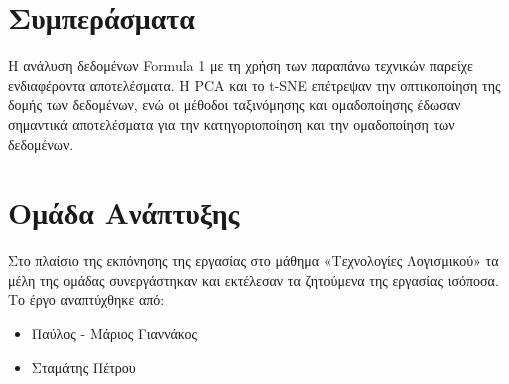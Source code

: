 \documentclass{article}
\begin{document}
\section{Συμπεράσματα}
Η ανάλυση δεδομένων Formula 1 με τη χρήση των παραπάνω τεχνικών παρείχε ενδιαφέροντα αποτελέσματα. Η PCA και το t-SNE επέτρεψαν την οπτικοποίηση της δομής των δεδομένων, ενώ οι μέθοδοι ταξινόμησης και ομαδοποίησης έδωσαν σημαντικά αποτελέσματα για την κατηγοριοποίηση και την ομαδοποίηση των δεδομένων.

\section{Ομάδα Ανάπτυξης}
Στο πλαίσιο της εκπόνησης της εργασίας στο μάθημα «Τεχνολογίες Λογισμικού» τα μέλη της ομάδας συνεργάστηκαν και εκτέλεσαν τα ζητούμενα της εργασίας ισόποσα. Το έργο αναπτύχθηκε από:
\begin{itemize}
    \item Παύλος - Μάριος Γιαννάκος 
    \item Σταμάτης Πέτρου
\end{itemize}
\end{document}
